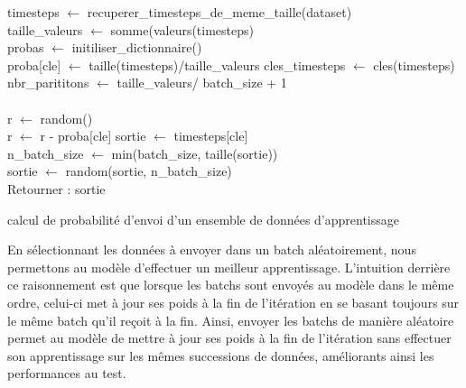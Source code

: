 \begin{algorithm2e}[H]
\SetAlgoLined
{}
\BlankLine
timesteps $\gets$ recuperer\_timesteps\_de\_meme\_taille(dataset)\\
taille\_valeurs $\gets$ somme(valeurs(timesteps)\\
probas $\gets$ initiliser\_dictionnaire() \\
    {proba[cle] $\gets$ taille(timesteps)/taille\_valeurs}
cles\_timesteps $\gets$ cles(timesteps)\\
nbr\_parititons $\gets$ taille\_valeurs/ batch\_size + 1 \\
\\
    r $\gets$ random() \\
    { r $\gets$ r - proba[cle]}
    sortie $\gets$ timesteps[cle] \\
    n\_batch\_size $\gets$ min(batch\_size, taille(sortie)) \\
    sortie $\gets$ random(sortie, n\_batch\_size) \\
    Retourner : sortie
 \caption{calcul de probabilité d'envoi d'un ensemble de données d'apprentissage \label{prob_donnees}}
\end{algorithm2e}

En sélectionnant les données à envoyer dans un batch aléatoirement, nous permettons au modèle d'effectuer un meilleur apprentissage. L'intuition derrière ce raisonnement est que lorsque les batchs sont envoyés au modèle dans le même ordre, celui-ci met à jour ses poids à la fin de l'itération en se basant toujours sur le même batch qu'il reçoit à la fin. Ainsi, envoyer les batchs de manière aléatoire permet au modèle de mettre à jour ses poids à la fin de l'itération sans effectuer son apprentissage sur les mêmes successions de données, améliorants ainsi les performances au test.

